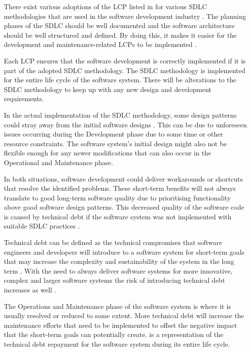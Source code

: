There exist various adoptions of the LCP listed in  for various SDLC methodologies that are used in the software development industry \cite{Al-Saiyd2015}. The planning phases of the SDLC should be well documented and the software architecture should be well structured and defined. By doing this, it makes it easier for the development and maintenance-related LCPs to be implemented \cite{Ackermann2009}.\par Each LCP ensures that the software development is correctly implemented if it is part of the adopted SDLC methodology. The SDLC methodology is implemented for the entire life cycle of the software system. There will be alterations to the SDLC methodology to keep up with any new design and development requirements.\par In the actual implementation of the SDLC methodology, some design patterns could stray away from the initial software designs \cite{Reimanis2016}. This can be due to unforeseen issues occurring during the Development phase due to some time or other resource constraints. The software system's initial design might also not be flexible enough for any newer modifications that can also occur in the Operational and Maintenance phase. \par In both situations, software development could deliver workarounds or shortcuts that resolve the identified problems. These short-term benefits will not always translate to good long-term software quality due to prioritising functionality above good software design patterns. This decreased quality of the software code is caused by technical debt if the software system was not implemented with suitable SDLC practices \cite{DeLeon-Sigg2020, Reimanis2016}.\par Technical debt can be defined as the technical compromises that software engineers and developers will introduce to a software system for short-term goals that may increase the complexity and sustainability of the system in the long term \cite{Snipes2018, Gralha2018}. With the need to always deliver software systems for more innovative, complex and larger software systems the risk of introducing technical debt increases as well \cite{Reimanis2016, Khan2013}. \par The Operations and Maintenance phase of the software system is where it is usually resolved or reduced to some extent. More technical debt will increase the maintenance efforts that need to be implemented to offset the negative impact that the short-term goals can potentially create.  is a representation of the technical debt repayment for the software system during its entire life cycle.

